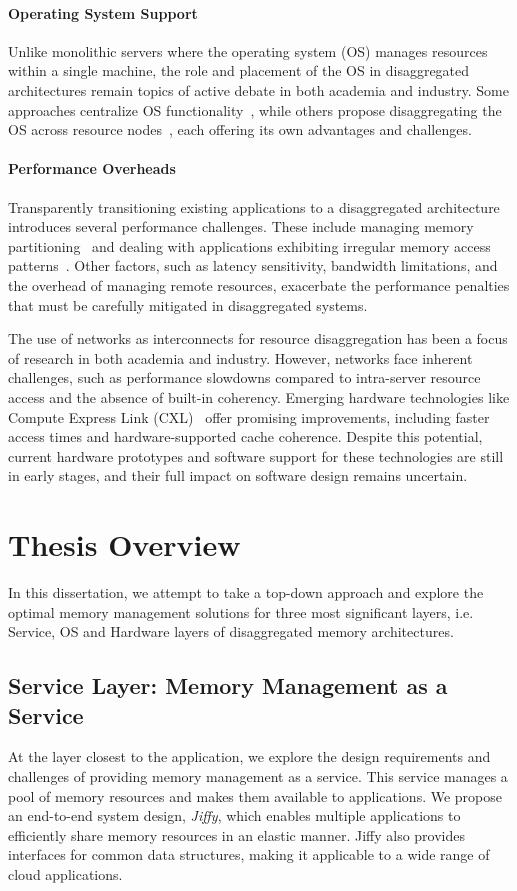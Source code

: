\paragraph{Operating System Support} Unlike monolithic servers where the operating system (OS) manages resources within a single machine, the role and placement of the OS in disaggregated architectures remain topics of active debate in both academia and industry. Some approaches centralize OS functionality~\cite{mind, chase}, while others propose disaggregating the OS across resource nodes~\cite{legoos}, each offering its own advantages and challenges.

\paragraph{Performance Overheads} Transparently transitioning existing applications to a disaggregated architecture introduces several performance challenges. These include managing memory partitioning~\cite{jiffy} and dealing with applications exhibiting irregular memory access patterns~\cite{chase}. Other factors, such as latency sensitivity, bandwidth limitations, and the overhead of managing remote resources, exacerbate the performance penalties that must be carefully mitigated in disaggregated systems.

 The use of networks as interconnects for resource disaggregation has been a focus of research in both academia and industry. However, networks face inherent challenges, such as performance slowdowns compared to intra-server resource access and the absence of built-in coherency. Emerging hardware technologies like Compute Express Link (CXL)~\cite{cxl, cxlasic, pond} offer promising improvements, including faster access times and hardware-supported cache coherence. Despite this potential, current hardware prototypes and software support for these technologies are still in early stages, and their full impact on software design remains uncertain.

\section{Thesis Overview}

In this dissertation, we attempt to take a top-down approach and explore the optimal memory management solutions for three most significant layers, i.e. Service, OS and Hardware layers of disaggregated memory architectures.

\subsection{Service Layer: Memory Management as a Service}
At the layer closest to the application, we explore the design requirements and challenges of providing memory management as a service. This service manages a pool of memory resources and makes them available to applications. We propose an end-to-end system design, \textit{Jiffy}, which enables multiple applications to efficiently share memory resources in an elastic manner. Jiffy also provides interfaces for common data structures, making it applicable to a wide range of cloud applications.

